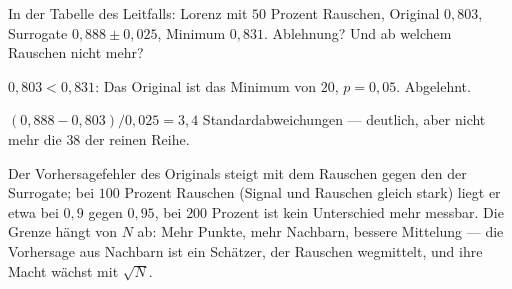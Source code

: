 \begin{aufgabe}
In der Tabelle des Leitfalls: Lorenz mit $50$ Prozent Rauschen, Original $0{,}803$, Surrogate $0{,}888 \pm 0{,}025$, Minimum $0{,}831$. Ablehnung? Und ab welchem Rauschen nicht mehr?

\loesung
{}
$0{,}803 < 0{,}831$: Das Original ist das Minimum von $20$, $p = 0{,}05$. Abgelehnt.

$(0{,}888 - 0{,}803)/0{,}025 = 3{,}4$ Standardabweichungen --- deutlich, aber nicht mehr die $38$ der reinen Reihe.

Der Vorhersagefehler des Originals steigt mit dem Rauschen gegen den der Surrogate; bei $100$ Prozent Rauschen (Signal und Rauschen gleich stark) liegt er etwa bei $0{,}9$ gegen $0{,}95$, bei $200$ Prozent ist kein Unterschied mehr messbar. Die Grenze hängt von $N$ ab: Mehr Punkte, mehr Nachbarn, bessere Mittelung --- die Vorhersage aus Nachbarn ist ein Schätzer, der Rauschen wegmittelt, und ihre Macht wächst mit $\sqrt N$.

\begin{center}
\begin{minipage}{0.88\textwidth}
\end{minipage}
\end{center}
\end{aufgabe}

